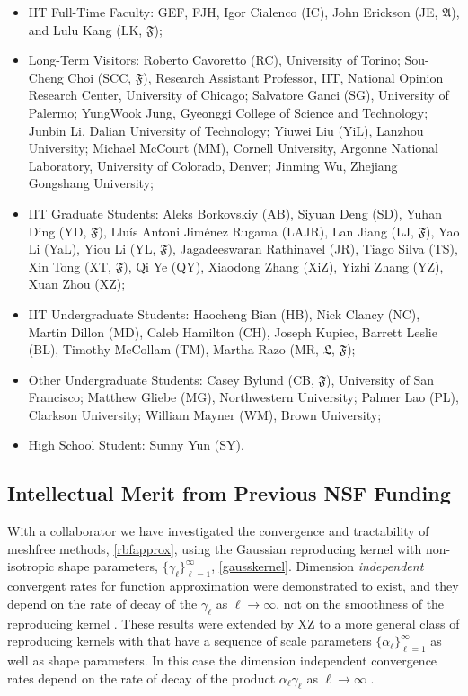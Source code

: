 \documentclass[11pt]{NSFamsart}
\newcommand{\fA}{\mathfrak{A}}
\newcommand{\fF}{\mathfrak{F}}
\newcommand{\fL}{\mathfrak{L}}
\begin{document}
\begin{itemize}[leftmargin=2.5ex]
\item IIT Full-Time Faculty: GEF, FJH, Igor Cialenco (IC), John Erickson (JE, $\fA$), and Lulu Kang (LK, $\fF$);
\item Long-Term Visitors: Roberto Cavoretto (RC), University of Torino; Sou-Cheng Choi (SCC, $\fF$), Research Assistant Professor, IIT, National Opinion Research Center, University of Chicago; Salvatore Ganci (SG), University of Palermo; YungWook Jung, Gyeonggi College of Science and Technology; Junbin Li, Dalian University of Technology; Yiuwei Liu (YiL), Lanzhou University; Michael McCourt (MM), Cornell University, Argonne National Laboratory, University of Colorado, Denver; Jinming Wu, Zhejiang Gongshang University;
\item IIT Graduate Students: Aleks Borkovskiy (AB), Siyuan Deng (SD), Yuhan Ding (YD, $\fF$), Llu\'is Antoni Jim\'enez Rugama (LAJR), Lan Jiang (LJ, $\fF$), Yao Li (YaL), Yiou Li (YL, $\fF$), Jagadeeswaran Rathinavel (JR), Tiago Silva (TS), Xin Tong (XT, $\fF$), Qi Ye (QY), Xiaodong Zhang (XiZ), Yizhi Zhang (YZ), Xuan Zhou (XZ);
\item IIT Undergraduate Students: Haocheng Bian (HB), Nick Clancy (NC), Martin Dillon (MD), Caleb Hamilton (CH), Joseph Kupiec, Barrett Leslie (BL), Timothy McCollam (TM), Martha Razo (MR, $\fL$, $\fF$);
\item Other Undergraduate Students: Casey Bylund (CB, $\fF$), University of San Francisco; Matthew Gliebe (MG), Northwestern University; Palmer Lao (PL), Clarkson University; William Mayner (WM), Brown University;
\item High School Student: Sunny Yun (SY).
\end{itemize}

\subsection{Intellectual Merit from Previous NSF Funding}
\label{previousmeritsubsec}

With a collaborator we have investigated the convergence and tractability of meshfree methods, \eqref{rbfapprox}, using the Gaussian reproducing kernel with non-isotropic shape parameters, $\{\gamma_{\ell}\}_{\ell =1}^{\infty}$, \eqref{gausskernel}. Dimension \emph{independent} convergent rates for function approximation were demonstrated to exist, and they depend on the rate of decay of the $\gamma_{\ell}$ as $\ell \to \infty$, not on the smoothness of the reproducing kernel \citep{FasHicWoz12b, FasHicWoz12a}. These results were extended by XZ to a more general class of reproducing kernels with that have a sequence of scale parameters $\{\alpha_{\ell}\}_{\ell=1}^{\infty}$ as well as shape parameters.  In this case the dimension independent convergence rates depend on the rate of decay of the product $\alpha_{\ell} \gamma_{\ell}$ as $\ell \to \infty$ \citep{ZhoHic15a}.
\end{document}
